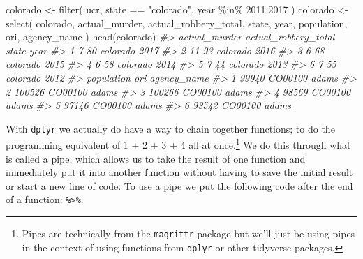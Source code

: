 \documentclass[
]{krantz}
\makeatletter
\newenvironment{Shaded}{\begin{snugshade}}{\end{snugshade}}
\newcommand{\CommentTok}[1]{\textcolor[rgb]{0.37,0.37,0.37}{\textit{#1}}}
\newcommand{\DecValTok}[1]{\textcolor[rgb]{0.06,0.06,0.06}{#1}}
\newcommand{\FunctionTok}[1]{\textcolor[rgb]{0,0,0}{#1}}
\newcommand{\NormalTok}[1]{#1}
\newcommand{\OtherTok}[1]{\textcolor[rgb]{0.37,0.37,0.37}{#1}}
\newcommand{\SpecialCharTok}[1]{\textcolor[rgb]{0,0,0}{#1}}
\newcommand{\StringTok}[1]{\textcolor[rgb]{0.5,0.5,0.5}{#1}}
\newenvironment{kframe}{%
\medskip{}
\setlength{\fboxsep}{.8em}
 \def\at@end@of@kframe{}%
 \ifinner\ifhmode%
  \def\at@end@of@kframe{\end{minipage}}%
  \begin{minipage}{\columnwidth}%
 \fi\fi%
 \def\FrameCommand##1{\hskip\@totalleftmargin \hskip-\fboxsep
 \colorbox{shadecolor}{##1}\hskip-\fboxsep
     \hskip-\linewidth \hskip-\@totalleftmargin \hskip\columnwidth}%
 \MakeFramed {\advance\hsize-\width
   \@totalleftmargin\z@ \linewidth\hsize
   \@setminipage}}%
 {\par\unskip\endMakeFramed%
 \at@end@of@kframe}
\renewenvironment{Shaded}{\begin{kframe}}{\end{kframe}}
\makeatother
\begin{document}
\begin{Shaded}
\begin{Highlighting}[]
\NormalTok{colorado }\OtherTok{\textless{}{-}} \FunctionTok{filter}\NormalTok{(}
\NormalTok{  ucr, state }\SpecialCharTok{==} \StringTok{"colorado"}\NormalTok{,}
\NormalTok{  year }\SpecialCharTok{\%in\%} \DecValTok{2011}\SpecialCharTok{:}\DecValTok{2017}
\NormalTok{)}
\NormalTok{colorado }\OtherTok{\textless{}{-}} \FunctionTok{select}\NormalTok{(}
\NormalTok{  colorado,}
\NormalTok{  actual\_murder,}
\NormalTok{  actual\_robbery\_total,}
\NormalTok{  state,}
\NormalTok{  year,}
\NormalTok{  population,}
\NormalTok{  ori,}
\NormalTok{  agency\_name}
\NormalTok{)}
\FunctionTok{head}\NormalTok{(colorado)}
\CommentTok{\#\textgreater{}   actual\_murder actual\_robbery\_total    state year}
\CommentTok{\#\textgreater{} 1             7                   80 colorado 2017}
\CommentTok{\#\textgreater{} 2            11                   93 colorado 2016}
\CommentTok{\#\textgreater{} 3             6                   68 colorado 2015}
\CommentTok{\#\textgreater{} 4             6                   58 colorado 2014}
\CommentTok{\#\textgreater{} 5             7                   44 colorado 2013}
\CommentTok{\#\textgreater{} 6             7                   55 colorado 2012}
\CommentTok{\#\textgreater{}   population     ori agency\_name}
\CommentTok{\#\textgreater{} 1      99940 CO00100       adams}
\CommentTok{\#\textgreater{} 2     100526 CO00100       adams}
\CommentTok{\#\textgreater{} 3     100266 CO00100       adams}
\CommentTok{\#\textgreater{} 4      98569 CO00100       adams}
\CommentTok{\#\textgreater{} 5      97146 CO00100       adams}
\CommentTok{\#\textgreater{} 6      93542 CO00100       adams}
\end{Highlighting}
\end{Shaded}

With \texttt{dplyr} we actually do have a way to chain
together functions; to do the programming equivalent of 1 +
2 + 3 + 4 all at once.\footnote{Pipes are technically from
  the \texttt{magrittr} package but we'll just be using
  pipes in the context of using functions from
  \texttt{dplyr} or other tidyverse packages.} We do this
through what is called a pipe, which allows us to take the
result of one function and immediately put it into another
function without having to save the initial result or start
a new line of code. To use a pipe we put the following code
after the end of a function: \texttt{\%\textgreater{}\%}.
\end{document}
